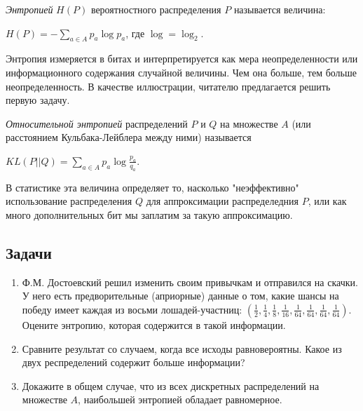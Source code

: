 \begin{definition} 
\textit{Энтропией} $H(P)$ вероятностного распределения $P$ называется величина:
\begin{center}
$H(P) = - \sum_{a \in A} p_a\log p_a$, где $\log = \log_2$.
\end{center}
Энтропия измеряется в битах и интерпретируется как мера неопределенности или информационного содержания случайной величины. Чем она больше, тем больше неопределенность. В качестве иллюстрации, читателю предлагается решить первую задачу.
\end{definition}

\begin{definition}
\textit{Относительной энтропией} распределений $P$ и $Q$ на множестве $A$ (или расстоянием Кульбака-Лейблера между ними) называется
\begin{center}
$KL(P||Q) = \sum_{a \in A} p_a \log \frac{p_a}{q_a}$. 
\end{center}
В статистике эта величина определяет то, насколько "неэффективно" использование распределения $Q$ для аппроксимации распределедния $P$, или как много дополнительных бит мы заплатим за такую аппроксимацию.
\end{definition}

\subsection{Задачи}


\begin{problem} 
\begin{enumerate}
\item Ф.М. Достоевский решил изменить своим привычкам и отправился на скачки. У него есть предворительные (априорные) данные о том, какие шансы на победу имеет каждая из восьми лошадей-участниц: $(\frac{1}{2}, \frac{1}{4}, \frac{1}{8}, \frac{1}{16}, \frac{1}{64}, \frac{1}{64}, \frac{1}{64}, \frac{1}{64})$. Оцените энтропию, которая содержится в такой информации. 
\item Сравните результат со случаем, когда все исходы равновероятны. Какое из двух респределений содержит больше информации?
\item Докажите в общем случае, что из всех дискретных распределений на множестве $A$, наибольшей энтропией обладает равномерное.
\end{enumerate}
\end{problem}


